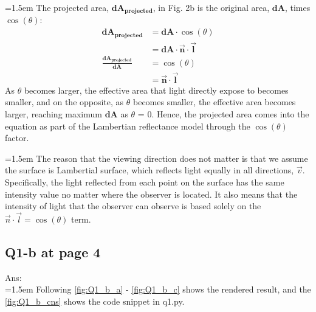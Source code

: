 \documentclass{article}
\begin{document}
	\hangindent=1.5em \hspace{1.5em}The projected area, $\mathbf{dA_{projected}}$, in Fig. 2b is the original area, $\mathbf{dA}$, times $\cos(\theta)$:
	\begin{align}
		\mathbf{dA_{projected}} &= \mathbf{dA} \cdot \cos(\theta) \\
								&= \mathbf{dA} \cdot \mathbf{\overrightarrow{n}} \cdot \mathbf{\overrightarrow{l}} \\
		\frac{\mathbf{dA_{projected}}}{\mathbf{dA}} &= \cos(\theta) \\
													&= \mathbf{\overrightarrow{n}} \cdot \mathbf{\overrightarrow{l}}
	\end{align}
	As $\theta$ becomes larger, the effective area that light directly expose to becomes smaller, and on the opposite, as $\theta$ becomes smaller, the effective area becomes larger, reaching maximum $\mathbf{dA}$ as $\theta$ = 0. Hence, the projected area comes into the equation as part of the Lambertian reflectance model through the $\cos(\theta)$ factor.
	\newline
	
	\hangindent=1.5em \hspace{1.5em}The reason that the viewing direction does not matter is that we assume the surface is Lambertial surface, which reflects light equally in all directions, $\vec{v}$. Specifically, the light reflected from each point on the surface has the same intensity value no matter where the observer is located. It also means that the intensity of light that the observer can observe is based solely on the $\vec{n} \cdot \vec{l} = \cos(\theta)$ term.

	\newpage
	
	\newpage
	\subsection*{Q1-b at page 4}
	Ans:\\
	\hangindent=1.5em \hspace{1.5em}Following \autoref{fig:Q1_b_a} - \autoref{fig:Q1_b_c} shows the rendered result, and the \autoref{fig:Q1_b_cns} shows the code snippet in q1.py.
	\newline
	
\end{document}
